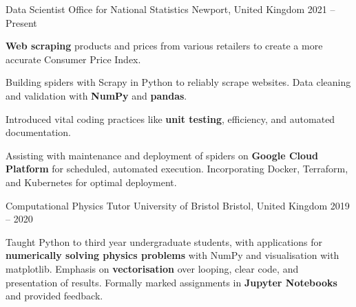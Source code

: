 
\begin{cventries}

    \cventry
        {Data Scientist} %
        {Office for National Statistics} %
        {Newport, United Kingdom} %
        {2021 -- Present} %
        {
            \begin{cvitems} %
                \item{\textbf{Web scraping} products and prices from various retailers to create a more accurate Consumer Price Index.}
                \item{Building spiders with Scrapy in Python to reliably scrape websites. Data cleaning and validation with \textbf{NumPy} and \textbf{pandas}.}
                \item{Introduced vital coding practices like \textbf{unit testing}, efficiency, and automated documentation.}
                \item{Assisting with maintenance and deployment of spiders on \textbf{Google Cloud Platform} for scheduled, automated execution. Incorporating Docker, Terraform, and Kubernetes for optimal deployment.}
            \end{cvitems}
        }

    \cventry
        {Computational Physics Tutor} %
        {University of Bristol} %
        {Bristol, United Kingdom} %
        {2019 -- 2020} %
        {
            \begin{cvitems} %
                \item{Taught Python to third year undergraduate students, with applications for \textbf{numerically solving physics problems} with NumPy and visualisation with matplotlib. Emphasis on \textbf{vectorisation} over looping, clear code, and presentation of results. Formally marked assignments in \textbf{Jupyter Notebooks} and provided feedback.}
            \end{cvitems}
        }


\end{cventries}
